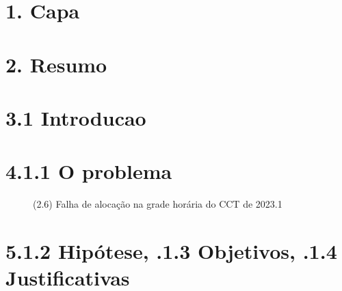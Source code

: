 

% 

\pretextual{} %


% 


% 
% 
% 
% 
% 
% 
% 
% 
% 

\textual{} %

\chapter*{1. Capa}
\chapter*{2. Resumo}


\chapter{3.1 Introducao}
\chapter*{4.1.1 O problema}

\cite{Barham1978}

\cite{Thomas2009}

\cite{Miranda2012}

\begin{figure}[htpb]\caption{(2.6) Falha de alocação na grade horária do CCT de 2023.1}\end{figure}

\chapter*{5.1.2 Hipótese, .1.3 Objetivos, .1.4 Justificativas}

